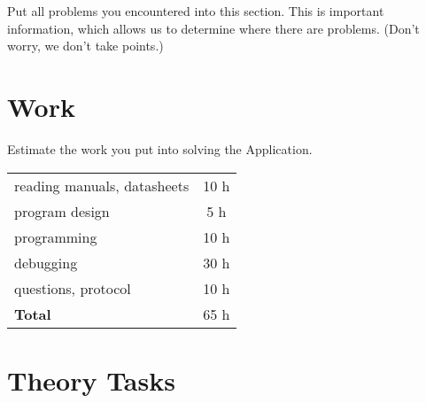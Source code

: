 \documentclass[12pt,a4paper,titlepage,oneside]{article}
\begin{document}
Put all problems you encountered into this section. This is important
information, which allows us to determine where there are problems.
(Don't worry, we don't take points.)


\section{Work}

Estimate the work you put into solving the Application.

\begin{tabular}{|l|c|}
\hline
reading manuals, datasheets	& 10 h	\\
program design			& 5 h	\\
programming			& 10 h	\\
debugging			& 30 h	\\
questions, protocol		& 10 h	\\
\hline
{\bf Total}			& 65 h	\\
\hline
\end{tabular}



\section{Theory Tasks}


\end{document}
